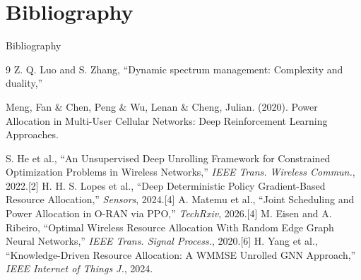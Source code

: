 \documentclass[aspectratio=169]{beamer}
\begin{document}
\section{Bibliography}
\begin{frame}{Bibliography}

\begin{thebibliography}{9}
Z. Q. Luo and S. Zhang, “Dynamic spectrum management: Complexity and duality,” 

Meng, Fan \& Chen, Peng \& Wu, Lenan \& Cheng, Julian. (2020). Power Allocation in Multi-User Cellular Networks: Deep Reinforcement Learning Approaches.

 S. He et al., ``An Unsupervised Deep Unrolling Framework for Constrained Optimization Problems in Wireless Networks,'' \textit{IEEE Trans. Wireless Commun.}, 2022.[2]
 H. H. S. Lopes et al., ``Deep Deterministic Policy Gradient-Based Resource Allocation,'' \textit{Sensors}, 2024.[4]
 A. Matemu et al., ``Joint Scheduling and Power Allocation in O-RAN via PPO,'' \textit{TechRxiv}, 2026.[4]
 M. Eisen and A. Ribeiro, ``Optimal Wireless Resource Allocation With Random Edge Graph Neural Networks,'' \textit{IEEE Trans. Signal Process.}, 2020.[6]
 H. Yang et al., ``Knowledge-Driven Resource Allocation: A WMMSE Unrolled GNN Approach,'' \textit{IEEE Internet of Things J.}, 2024.

\end{thebibliography}

\end{frame}
\end{document}

